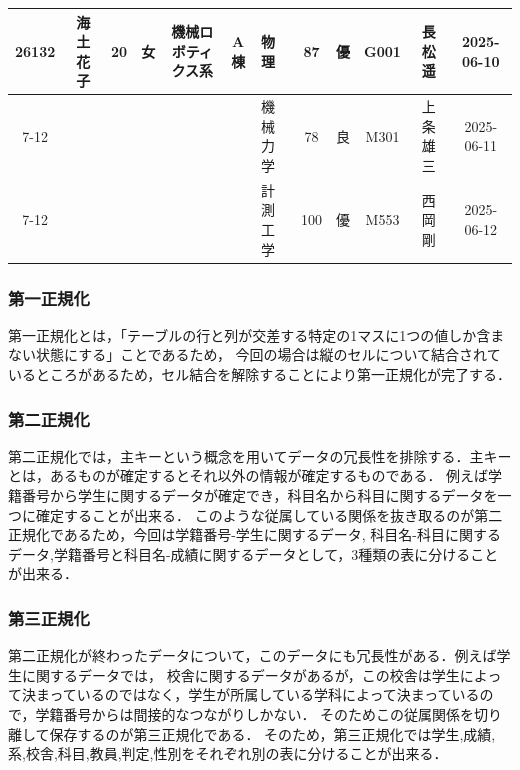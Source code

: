 \documentclass[a4paper,11pt]{ltjsarticle}
\begin{document}
\begin{table}[htbp]
{\begin{tabular}{|c|c|c|c|c|c|l|c|c|c|c|c|}
      \multirow{3}{*}{26132} & \multirow{3}{*}{海土 花子} & \multirow{3}{*}{20} & \multirow{3}{*}{女} & \multirow{3}{*}{機械ロボティクス系}   & \multirow{3}{*}{A棟} & 物理           & 87          & 優           & G001           & 長松 遥         & 2025-06-10   \\ \cline{7-12}
                             &                        &                     &                    &                              &                     & 機械力学         & 78          & 良           & M301           & 上条 雄三        & 2025-06-11   \\ \cline{7-12}
                             &                        &                     &                    &                              &                     & 計測工学         & 100         & 優           & M553           & 西岡 剛         & 2025-06-12   \\
      \hline
    \end{tabular}
  }
\end{table}
\subsubsection{第一正規化}
第一正規化とは，「テーブルの行と列が交差する特定の1マスに1つの値しか含まない状態にする」ことであるため，
今回の場合は縦のセルについて結合されているところがあるため，セル結合を解除することにより第一正規化が完了する．
\subsubsection{第二正規化}
第二正規化では，主キーという概念を用いてデータの冗長性を排除する．主キーとは，あるものが確定するとそれ以外の情報が確定するものである．
例えば学籍番号から学生に関するデータが確定でき，科目名から科目に関するデータを一つに確定することが出来る．
このような従属している関係を抜き取るのが第二正規化であるため，今回は学籍番号-学生に関するデータ,
科目名-科目に関するデータ,学籍番号と科目名-成績に関するデータとして，3種類の表に分けることが出来る．
\subsubsection{第三正規化}
第二正規化が終わったデータについて，このデータにも冗長性がある．例えば学生に関するデータでは，
校舎に関するデータがあるが，この校舎は学生によって決まっているのではなく，学生が所属している学科によって決まっているので，学籍番号からは間接的なつながりしかない．
そのためこの従属関係を切り離して保存するのが第三正規化である．
そのため，第三正規化では学生,成績,系,校舎,科目,教員,判定,性別をそれぞれ別の表に分けることが出来る．
\end{document}
